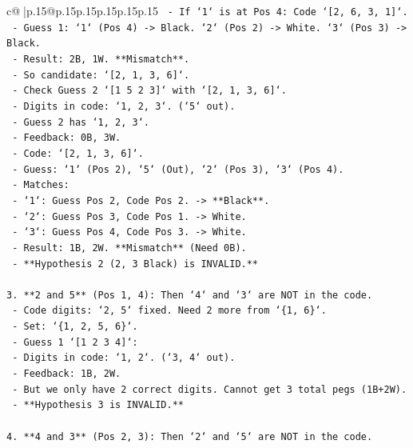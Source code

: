 \documentclass{article}
\begin{document}
{\begin{supertabular}{c@{$\;$}|p{.15\linewidth}@{}p{.15\linewidth}p{.15\linewidth}p{.15\linewidth}p{.15\linewidth}p{.15\linewidth}}
{{{\texttt{        {-} If `1` is at Pos 4: Code `{[}2, 6, 3, 1{]}`.} \\
\texttt{            {-} Guess 1: `1` (Pos 4) {-}> Black. `2` (Pos 2) {-}> White. `3` (Pos 3) {-}> Black.} \\
\texttt{            {-} Result: 2B, 1W. **Mismatch**.} \\
\texttt{        {-} So candidate: `{[}2, 1, 3, 6{]}`.} \\
\texttt{    {-} Check Guess 2 `{[}1 5 2 3{]}` with `{[}2, 1, 3, 6{]}`.} \\
\texttt{        {-} Digits in code: `1, 2, 3`. (`5` out).} \\
\texttt{        {-} Guess 2 has `1, 2, 3`.} \\
\texttt{        {-} Feedback: 0B, 3W.} \\
\texttt{        {-} Code: `{[}2, 1, 3, 6{]}`.} \\
\texttt{        {-} Guess: `1` (Pos 2), `5` (Out), `2` (Pos 3), `3` (Pos 4).} \\
\texttt{        {-} Matches:} \\
\texttt{            {-} `1`: Guess Pos 2, Code Pos 2. {-}> **Black**.} \\
\texttt{            {-} `2`: Guess Pos 3, Code Pos 1. {-}> White.} \\
\texttt{            {-} `3`: Guess Pos 4, Code Pos 3. {-}> White.} \\
\texttt{        {-} Result: 1B, 2W. **Mismatch** (Need 0B).} \\
\texttt{        {-} **Hypothesis 2 (2, 3 Black) is INVALID.**} \\
\\ 
\texttt{3.  **2 and 5** (Pos 1, 4): Then `4` and `3` are NOT in the code.} \\
\texttt{    {-} Code digits: `2, 5` fixed. Need 2 more from `\{1, 6\}`.} \\
\texttt{    {-} Set: `\{1, 2, 5, 6\}`.} \\
\texttt{    {-} Guess 1 `{[}1 2 3 4{]}`:} \\
\texttt{        {-} Digits in code: `1, 2`. (`3, 4` out).} \\
\texttt{        {-} Feedback: 1B, 2W.} \\
\texttt{        {-} But we only have 2 correct digits. Cannot get 3 total pegs (1B+2W).} \\
\texttt{        {-} **Hypothesis 3 is INVALID.**} \\
\\ 
\texttt{4.  **4 and 3** (Pos 2, 3): Then `2` and `5` are NOT in the code.} \\
}}}
\end{supertabular}}
\end{document}
